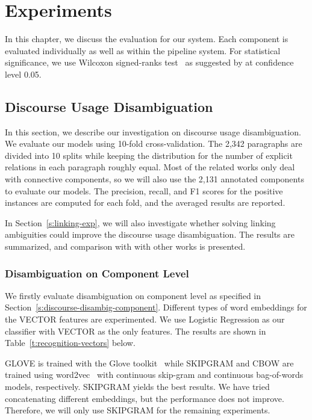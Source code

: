 %
%
%
\chapter{Experiments}
\label{c:exp}

In this chapter, we discuss the evaluation for our system. Each component
is evaluated individually as well as within the pipeline system. For
statistical significance, we use Wilcoxon signed-ranks test~\citep{wilcoxon1945individual}
as suggested by \cite{demvsar2006statistical} at confidence level 0.05.

\section{Discourse Usage Disambiguation}
\label{s:discourse-usage-exp}

In this section, we describe our investigation
on discourse usage disambiguation. We evaluate our models using
10-fold cross-validation. The 2,342 paragraphs are divided  into 10 splits
while keeping the distribution for the number of explicit relations
in each paragraph roughly equal. Most of the related works only
deal with connective components, so we will also use the 2,131 annotated
components to evaluate our models.
The precision, recall, and F1 scores for the positive instances are computed
for each fold, and the averaged results are reported.

In Section~\ref{s:linking-exp}, we will also investigate whether solving linking
ambiguities could improve the discourse usage disambiguation. The results
are summarized, and comparison with with other works is presented.


\subsection{Disambiguation on Component Level}

We firstly evaluate disambiguation on component level as specified in
Section~\ref{s:discourse-disambig-component}.  
Different types of word embeddings for
the VECTOR features are experimented. We use Logistic Regression
as our classifier with VECTOR as the only features. The results are
shown in Table~\ref{t:recognition-vectors} below. 



GLOVE is trained with the Glove toolkit~\citep{pennington2014glove}
while SKIPGRAM and CBOW are trained using word2vec~\citep{mikolov2013efficient} with
continuous skip-gram and continuous bag-of-words models,
respectively. SKIPGRAM yields the best results.
We have tried concatenating different embeddings,
but the performance does not improve. Therefore, we will only use SKIPGRAM
for the remaining experiments.

